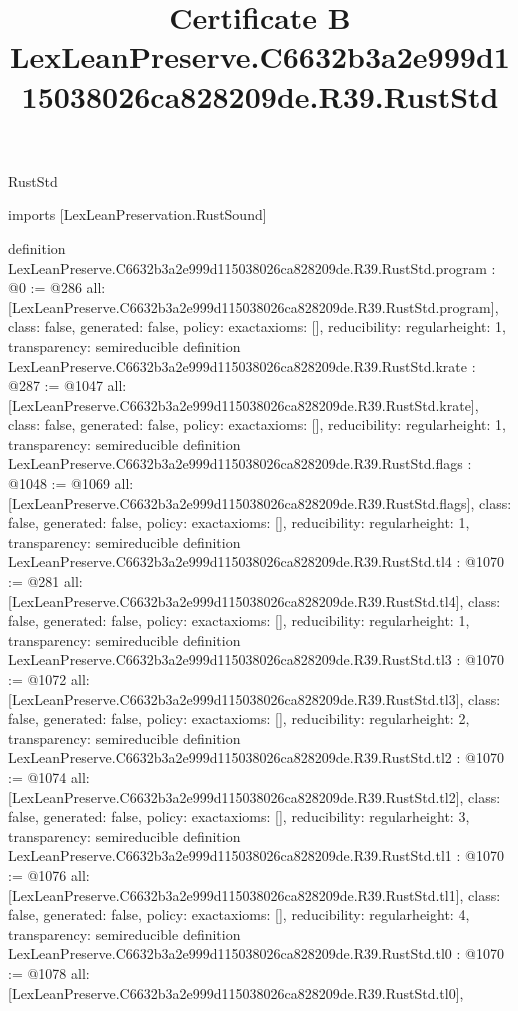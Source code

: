 \begin{lexlean}{RustStd}
\title{Certificate B LexLeanPreserve.C6632b3a2e999d115038026ca828209de.R39.RustStd}
\begin{coremodule}
imports [LexLeanPreservation.RustSound]

definition LexLeanPreserve.C6632b3a2e999d115038026ca828209de.R39.RustStd.program : @0 := @286 {
  all: [LexLeanPreserve.C6632b3a2e999d115038026ca828209de.R39.RustStd.program],
  class: false,
  generated: false,
  policy: exact{axioms: []},
  reducibility: regular{height: 1},
  transparency: semireducible
}
definition LexLeanPreserve.C6632b3a2e999d115038026ca828209de.R39.RustStd.krate : @287 := @1047 {
  all: [LexLeanPreserve.C6632b3a2e999d115038026ca828209de.R39.RustStd.krate],
  class: false,
  generated: false,
  policy: exact{axioms: []},
  reducibility: regular{height: 1},
  transparency: semireducible
}
definition LexLeanPreserve.C6632b3a2e999d115038026ca828209de.R39.RustStd.flags : @1048 := @1069 {
  all: [LexLeanPreserve.C6632b3a2e999d115038026ca828209de.R39.RustStd.flags],
  class: false,
  generated: false,
  policy: exact{axioms: []},
  reducibility: regular{height: 1},
  transparency: semireducible
}
definition LexLeanPreserve.C6632b3a2e999d115038026ca828209de.R39.RustStd.tl4 : @1070 := @281 {
  all: [LexLeanPreserve.C6632b3a2e999d115038026ca828209de.R39.RustStd.tl4],
  class: false,
  generated: false,
  policy: exact{axioms: []},
  reducibility: regular{height: 1},
  transparency: semireducible
}
definition LexLeanPreserve.C6632b3a2e999d115038026ca828209de.R39.RustStd.tl3 : @1070 := @1072 {
  all: [LexLeanPreserve.C6632b3a2e999d115038026ca828209de.R39.RustStd.tl3],
  class: false,
  generated: false,
  policy: exact{axioms: []},
  reducibility: regular{height: 2},
  transparency: semireducible
}
definition LexLeanPreserve.C6632b3a2e999d115038026ca828209de.R39.RustStd.tl2 : @1070 := @1074 {
  all: [LexLeanPreserve.C6632b3a2e999d115038026ca828209de.R39.RustStd.tl2],
  class: false,
  generated: false,
  policy: exact{axioms: []},
  reducibility: regular{height: 3},
  transparency: semireducible
}
definition LexLeanPreserve.C6632b3a2e999d115038026ca828209de.R39.RustStd.tl1 : @1070 := @1076 {
  all: [LexLeanPreserve.C6632b3a2e999d115038026ca828209de.R39.RustStd.tl1],
  class: false,
  generated: false,
  policy: exact{axioms: []},
  reducibility: regular{height: 4},
  transparency: semireducible
}
definition LexLeanPreserve.C6632b3a2e999d115038026ca828209de.R39.RustStd.tl0 : @1070 := @1078 {
  all: [LexLeanPreserve.C6632b3a2e999d115038026ca828209de.R39.RustStd.tl0],
}
\end{coremodule}
\end{lexlean}
